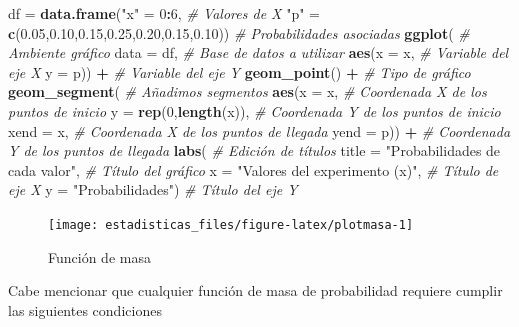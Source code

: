 \documentclass[
  11pt,
]{book}
\newenvironment{Shaded}{\begin{snugshade}}{\end{snugshade}}
\newcommand{\AttributeTok}[1]{\textcolor[rgb]{0.13,0.29,0.53}{#1}}
\newcommand{\CommentTok}[1]{\textcolor[rgb]{0.56,0.35,0.01}{\textit{#1}}}
\newcommand{\DecValTok}[1]{\textcolor[rgb]{0.00,0.00,0.81}{#1}}
\newcommand{\FloatTok}[1]{\textcolor[rgb]{0.00,0.00,0.81}{#1}}
\newcommand{\FunctionTok}[1]{\textcolor[rgb]{0.13,0.29,0.53}{\textbf{#1}}}
\newcommand{\NormalTok}[1]{#1}
\newcommand{\OtherTok}[1]{\textcolor[rgb]{0.56,0.35,0.01}{#1}}
\newcommand{\SpecialCharTok}[1]{\textcolor[rgb]{0.81,0.36,0.00}{\textbf{#1}}}
\newcommand{\StringTok}[1]{\textcolor[rgb]{0.31,0.60,0.02}{#1}}
\theoremstyle{definition}
\theoremstyle{definition}
\theoremstyle{definition}
\theoremstyle{definition}
\theoremstyle{remark}
\begin{document}
\begin{Shaded}
\begin{Highlighting}[]
\NormalTok{df }\OtherTok{=} \FunctionTok{data.frame}\NormalTok{(}\StringTok{"x"} \OtherTok{=} \DecValTok{0}\SpecialCharTok{:}\DecValTok{6}\NormalTok{, }\CommentTok{\# Valores de X}
                \StringTok{"p"} \OtherTok{=} \FunctionTok{c}\NormalTok{(}\FloatTok{0.05}\NormalTok{,}\FloatTok{0.10}\NormalTok{,}\FloatTok{0.15}\NormalTok{,}\FloatTok{0.25}\NormalTok{,}\FloatTok{0.20}\NormalTok{,}\FloatTok{0.15}\NormalTok{,}\FloatTok{0.10}\NormalTok{)) }\CommentTok{\# Probabilidades asociadas}
\FunctionTok{ggplot}\NormalTok{( }\CommentTok{\# Ambiente gráfico}
  \AttributeTok{data =}\NormalTok{ df, }\CommentTok{\# Base de datos a utilizar}
  \FunctionTok{aes}\NormalTok{(}\AttributeTok{x =}\NormalTok{ x, }\CommentTok{\# Variable del eje X}
      \AttributeTok{y =}\NormalTok{ p)) }\SpecialCharTok{+} \CommentTok{\# Variable del eje Y}
  \FunctionTok{geom\_point}\NormalTok{() }\SpecialCharTok{+} \CommentTok{\# Tipo de gráfico}
  \FunctionTok{geom\_segment}\NormalTok{( }\CommentTok{\# Añadimos segmentos}
    \FunctionTok{aes}\NormalTok{(}\AttributeTok{x =}\NormalTok{ x, }\CommentTok{\# Coordenada X de los puntos de inicio}
        \AttributeTok{y =} \FunctionTok{rep}\NormalTok{(}\DecValTok{0}\NormalTok{,}\FunctionTok{length}\NormalTok{(x)), }\CommentTok{\# Coordenada Y de los puntos de inicio}
        \AttributeTok{xend =}\NormalTok{ x, }\CommentTok{\# Coordenada X de los puntos de llegada}
        \AttributeTok{yend =}\NormalTok{ p)) }\SpecialCharTok{+} \CommentTok{\# Coordenada Y de los puntos de llegada}
  \FunctionTok{labs}\NormalTok{( }\CommentTok{\# Edición de títulos}
    \AttributeTok{title =} \StringTok{"Probabilidades de cada valor"}\NormalTok{, }\CommentTok{\# Título del gráfico}
    \AttributeTok{x =} \StringTok{"Valores del experimento (x)"}\NormalTok{, }\CommentTok{\# Título de eje X}
    \AttributeTok{y =} \StringTok{"Probabilidades"}\NormalTok{) }\CommentTok{\# Título del eje Y}
\end{Highlighting}
\end{Shaded}

\begin{figure}

{\centering \texttt{[image: estadisticas\_files/figure-latex/plotmasa-1]} 

}

\caption{Función de masa}\label{fig:plotmasa}
\end{figure}

Cabe mencionar que cualquier función de masa de probabilidad requiere cumplir las siguientes condiciones
\end{document}
